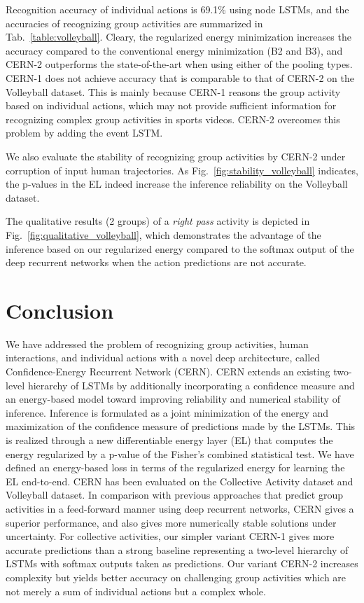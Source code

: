 \documentclass[10pt,twocolumn,letterpaper]{article}
\begin{document}
Recognition accuracy of individual actions is 69.1\% using node LSTMs, and the accuracies of recognizing group activities are summarized in Tab.~\ref{table:volleyball}. Cleary, the regularized energy minimization increases the accuracy compared to the conventional energy minimization (B2 and B3), and CERN-2 outperforms the state-of-the-art when using either of the pooling types. CERN-1 does not achieve accuracy that is comparable to that of CERN-2 on the Volleyball dataset. This is mainly because CERN-1 reasons the group activity based on individual actions, which may not provide sufficient information for recognizing complex group activities in sports videos. CERN-2 overcomes this problem by adding the event LSTM.

We also evaluate the stability of recognizing group activities by CERN-2 under corruption of input human trajectories. As Fig.~\ref{fig:stability_volleyball} indicates, the p-values in the EL indeed increase the inference reliability on the Volleyball dataset.

The qualitative results (2 groups) of a \textit{right pass} activity is depicted in Fig.~\ref{fig:qualitative_volleyball}, which demonstrates the advantage of the inference based on our regularized energy compared to the softmax output of the deep recurrent networks when the action predictions are not accurate.
 


\section{Conclusion}

We have addressed the problem of recognizing group activities, human interactions, and individual actions with a novel deep architecture, called Confidence-Energy Recurrent Network (CERN). CERN extends an existing two-level hierarchy of LSTMs by additionally incorporating a confidence measure and an energy-based model toward improving reliability and numerical stability of inference. Inference is formulated as a joint minimization of the energy and maximization of the confidence measure of predictions made by the LSTMs. This is realized through a new differentiable energy layer (EL) that computes the energy regularized by a p-value of the Fisher's combined statistical test. We have defined an energy-based loss in terms of the regularized energy for learning the EL  end-to-end. CERN has been evaluated on the Collective Activity dataset and Volleyball dataset. In comparison with previous approaches that predict group activities in a feed-forward manner using deep recurrent networks, CERN gives a superior performance, and also gives more numerically stable solutions under uncertainty. For collective activities, our simpler variant CERN-1 gives more accurate predictions than a strong baseline representing a two-level hierarchy of LSTMs with softmax outputs taken as predictions. Our variant CERN-2 increases complexity but yields better accuracy on challenging group activities which are not merely a sum of individual actions but a complex whole.
\end{document}
